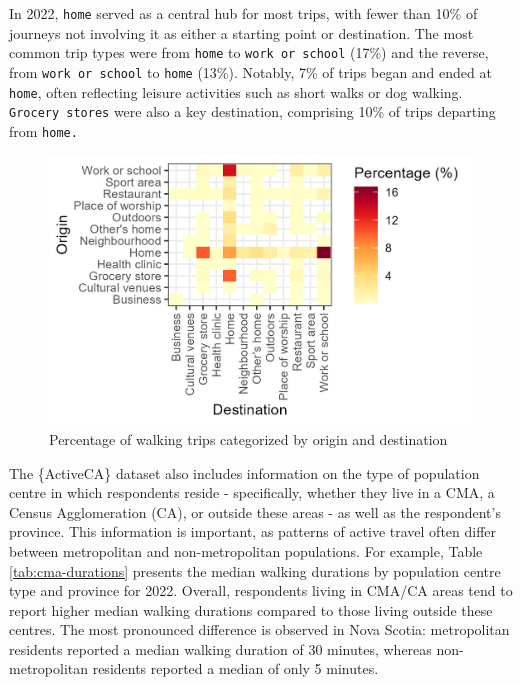 \documentclass[Royal,times,sageh]{sagej}
\begin{document}
In 2022, \texttt{home} served as a central hub for most trips, with
fewer than 10\% of journeys not involving it as either a starting point
or destination. The most common trip types were from \texttt{home} to
\texttt{work\ or\ school} (17\%) and the reverse, from
\texttt{work\ or\ school} to \texttt{home} (13\%). Notably, 7\% of trips
began and ended at \texttt{home}, often reflecting leisure activities
such as short walks or dog walking. \texttt{Grocery\ stores} were also a
key destination, comprising 10\% of trips departing from \texttt{home.}

\begin{figure}

{\centering \includegraphics[width=1\linewidth]{Manuscript-figures/walking_hm_2022} 

}

\caption{Percentage of walking trips categorized by origin and destination}\label{fig:figure-01}
\end{figure}

The \{ActiveCA\} dataset also includes information on the type of
population centre in which respondents reside - specifically, whether
they live in a CMA, a Census Agglomeration (CA), or outside these areas
- as well as the respondent's province. This information is important,
as patterns of active travel often differ between metropolitan and
non-metropolitan populations. For example, Table \ref{tab:cma-durations}
presents the median walking durations by population centre type and
province for 2022. Overall, respondents living in CMA/CA areas tend to
report higher median walking durations compared to those living outside
these centres. The most pronounced difference is observed in Nova
Scotia: metropolitan residents reported a median walking duration of 30
minutes, whereas non-metropolitan residents reported a median of only 5
minutes.
\end{document}
